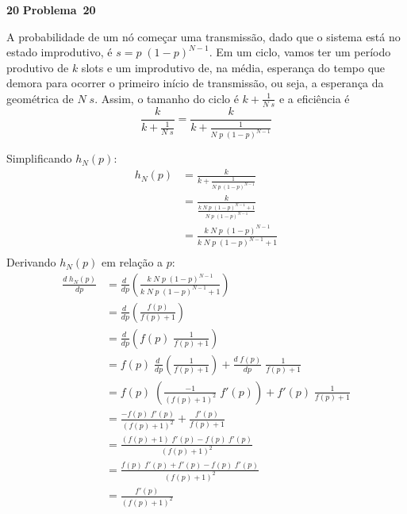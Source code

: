 \documentclass{article}
\newcounter{exe-list}
\newenvironment{exe-list}
    {\begin{list}{\alph{exe-list}.}{\usecounter{exe-list}}}
    {\end{list}}
\newenvironment{exe}[2][Problema]
    {\newcommand{\opt}{(Opcional)}%
    \newcommand{\sketch}[1]{{\bfseries Rascunho:} ##1}%
    \medskip\par\noindent\ifthenelse{\equal{#1}{}}
        {\textbf{\large #2}}
        {\textbf{\large #1~#2}}%
    \medskip\par\noindent}
    {\medskip}
\begin{document}
\begin{exe}{20}
    \begin{exe-list}
    \item
        A probabilidade de um nó começar uma transmissão,
        dado que o sistema está no estado improdutivo, é
        \(s = p \; (1-p)^{N-1}\).
        Em um ciclo, vamos ter um período produtivo de \(k\) slots
        e um improdutivo de, na média,
        esperança do tempo que demora para ocorrer
        o primeiro início de transmissão,
        ou seja, a esperança da geométrica de \(N \; s\).
        Assim, o tamanho do ciclo é
        \(k + \frac{1}{N \; s}\) e
        a eficiência é
        \[
            \frac{k}{k + \frac{1}{N \; s}}
            = \frac{k}{k + \frac{1}{N \; p \; (1-p)^{N-1}}}
        \]
    \item
        Simplificando \(h_N(p)\):
        \begin{align*}
            h_N(p)
            &= \frac{k}{k + \frac{1}{N \; p \; (1-p)^{N-1}}} \\
            &= \frac{k}{\frac{k \; N \; p \; (1-p)^{N-1} + 1}{N \; p \; (1-p)^{N-1}}} \\
            &= \frac{k \; N \; p \; (1-p)^{N-1}}{k \; N \; p \; (1-p)^{N-1} + 1} \\
        \end{align*}
        Derivando \(h_N(p)\) em relação a \(p\):
        \begin{align*}
            \frac{d \; h_N(p)}{dp}
            &= \frac{d \;}{dp} \left( \frac{k \; N \; p \; (1-p)^{N-1}}{k \; N \; p \; (1-p)^{N-1} + 1} \right) \\
            &= \frac{d \;}{dp} \left( \frac{f(p)}{f(p) + 1} \right) \\
            &= \frac{d \;}{dp} \left( f(p) \; \frac{1}{f(p) + 1} \right) \\
            &= f(p) \; \frac{d \;}{dp} \left( \frac{1}{f(p) + 1} \right)
                + \frac{d \; f(p)}{dp} \; \frac{1}{f(p) + 1} \\
            &= f(p) \; \left( \frac{-1}{(f(p) + 1)^2} \; f'(p) \right)
                + f'(p) \; \frac{1}{f(p) + 1} \\
            &= \frac{- f(p) \; f'(p)}{(f(p) + 1)^2} + \frac{f'(p)}{f(p) + 1} \\
            &= \frac{(f(p) + 1) \; f'(p) - f(p) \; f'(p)}{(f(p) + 1)^2} \\
            &= \frac{f(p) \; f'(p) + f'(p) - f(p) \; f'(p)}{(f(p) + 1)^2} \\
            &= \frac{f'(p)}{(f(p) + 1)^2} \\

\end{align*}
\end{exe-list}
\end{exe}
\end{document}

